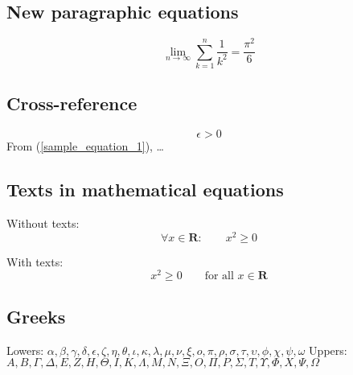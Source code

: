 \documentclass[12pt, oneside]{article}
\begin{document}
\subsection{New paragraphic equations}
\begin{displaymath}
\lim_{n \rightarrow \infty}
\sum_{k=1}^n \frac{1}{k^2}
= \frac{\pi^2}{6}
\end{displaymath}



\subsection{Cross-reference}
\begin{equation}
\label{sample_equation_1}
\epsilon > 0
\end{equation}
From (\ref{sample_equation_1}), \ldots



\subsection{Texts in mathematical equations}

Without texts:
\begin{equation}
\forall x \in \mathbf{R}: \qquad x^{2} \geq 0 %
\end{equation}

With texts:
\begin{equation}
x^{2} \geq 0 \qquad \textrm{for all }x \in \mathbf{R} 
\end{equation}



\subsection{Greeks}
Lowers: $\alpha, \beta, \gamma, \delta, \epsilon, \zeta, \eta, \theta, \iota, \kappa, \lambda, \mu, \nu,
\xi, o, \pi, \rho, \sigma, \tau, \upsilon, \phi, \chi, \psi, \omega$ \newline
Uppers: $A, B, \Gamma, \Delta, E, Z, H, \Theta, I, K, \Lambda, M, N, \Xi, O, \Pi, P, \Sigma, T, \Upsilon, \Phi, X, \Psi, \Omega$
\end{document}
